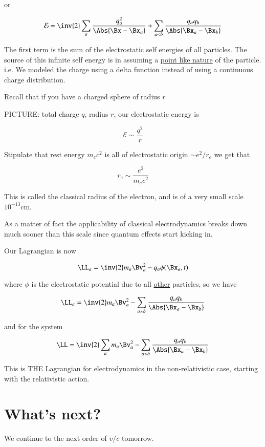 or

\begin{equation}\label{eqn:relativisticElectrodynamicsL24:310}
\mathcal{E} = \inv{2} \sum_a \frac{q_a^2}{\Abs{\Bx - \Bx_a}} + \sum_{a < b} \frac{q_a q_b}{\Abs{\Bx_a - \Bx_b}}
\end{equation}

The first term is the sum of the electrostatic self energies of all particles.  The source of this infinite self energy is in assuming a \underline{point like nature} of the particle.  i.e.  We modeled the charge using a delta function instead of using a continuous charge distribution.

Recall that if you have a charged sphere of radius $r$

PICTURE: total charge $q$, radius $r$, our electrostatic energy is 

\begin{equation}\label{eqn:relativisticElectrodynamicsL24:330}
\mathcal{E} \sim \frac{q^2}{r}
\end{equation}

Stipulate that rest energy $m_e c^2$ is all of electrostatic origin $\sim e^2/r_e$ we get that 

\begin{equation}\label{eqn:relativisticElectrodynamicsL24:350}
r_e \sim \frac{e^2}{m_e c^2}
\end{equation}

This is called the classical radius of the electron, and is of a very small scale $10^{-13} \text{cm}$.

As a matter of fact the applicability of classical electrodynamics breaks down much sooner than this scale since quantum effects start kicking in.

Our Lagrangian is now

\begin{equation}\label{eqn:relativisticElectrodynamicsL24:370}
\LL_a = \inv{2} m_a \Bv_a^2 - q_a \phi(\Bx_a, t)
\end{equation}

where $\phi$ is the electrostatic potential due to all \underline{other} particles, so we have

\begin{equation}\label{eqn:relativisticElectrodynamicsL24:390}
\LL_a = \inv{2} m_a \Bv_a^2 - \sum_{a \ne b} \frac{q_a q_b }{\Abs{\Bx_a - \Bx_b}}
\end{equation}

and for the system

\begin{equation}\label{eqn:relativisticElectrodynamicsL24:410}
\LL = \inv{2} \sum_a m_a \Bv_a^2 - \sum_{a < b} \frac{q_a q_b }{\Abs{\Bx_a - \Bx_b}}
\end{equation}

This is THE Lagrangian for electrodynamics in the non-relativistic case, starting with the relativistic action.

\section{What's next?}

We continue to the next order of $v/c$ tomorrow.

\EndArticle
